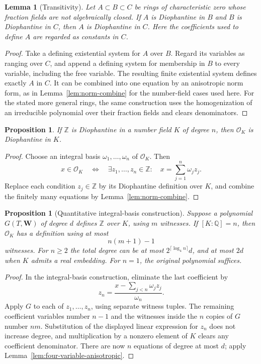 \documentclass[11pt]{article}
\newtheorem{proposition}[theorem]{Proposition}
\newtheorem{lemma}[theorem]{Lemma}
\theoremstyle{definition}
\begin{document}
\begin{lemma}[Transitivity]\label{lem:diophantine-transitivity-nf}
Let $A\subset B\subset C$ be rings of characteristic zero whose
fraction fields are not algebraically closed.  If $A$ is Diophantine in
$B$ and $B$ is Diophantine in $C$, then $A$ is Diophantine in $C$.
Here the coefficients used to define $A$ are regarded as constants in $C$.
\end{lemma}
\begin{proof}
Take a defining existential system for $A$ over $B$.  Regard its
variables as ranging over $C$, and append a defining system for
membership in $B$ to every variable, including the free variable.
The resulting finite existential system defines exactly $A$ in $C$.
It can be combined into one equation by an anisotropic norm form,
as in Lemma~\ref{lem:norm-combine} for the number-field cases used here.
For the stated more general rings, the same construction uses the
homogenization of an irreducible polynomial over their fraction fields
and clears denominators.
\end{proof}

\begin{proposition}\label{prop:integral-basis-transfer}
If $\mathbb Z$ is Diophantine in a number field $K$ of degree $n$, then
$\mathcal O_K$ is Diophantine in $K$.
\end{proposition}
\begin{proof}
Choose an integral basis $\omega_1,\ldots,\omega_n$ of $\mathcal O_K$.
Then
\[
 x\in\mathcal O_K\quad\Longleftrightarrow\quad
 \exists z_1,\ldots,z_n\in\mathbb Z:\quad
 x=\sum_{j=1}^n\omega_jz_j.
\]
Replace each condition $z_j\in\mathbb Z$ by its Diophantine
definition over $K$, and combine the finitely many equations by
Lemma~\ref{lem:norm-combine}.
\end{proof}

\begin{proposition}[Quantitative integral-basis construction]
\label{prop:quantitative-integral-basis}
Suppose a polynomial $G(T,\mathbf W)$ of degree $d$ defines
$\mathbb Z$ over $K$, using $m$ witnesses.  If $[K:\mathbb Q]=n$,
then $\mathcal O_K$ has a definition using at most
\[
 n(m+1)-1
\]
witnesses.  For $n\geq2$ the total degree can be at most
$2^{\lceil\log_4 n\rceil}d$, and at most $2d$ when $K$ admits a
real embedding.  For $n=1$, the original polynomial suffices.
\end{proposition}
\begin{proof}
In the integral-basis construction, eliminate the last coefficient by
\[
 z_n=\frac{x-\sum_{j<n}\omega_j z_j}{\omega_n}.
\]
Apply $G$ to each of $z_1,\ldots,z_n$, using separate witness tuples.
The remaining coefficient variables number $n-1$ and the witnesses
inside the $n$ copies of $G$ number $nm$.  Substitution of the displayed
linear expression for $z_n$ does not increase degree, and multiplication
by a nonzero element of $K$ clears any coefficient denominator.  There
are now $n$ equations of degree at most $d$; apply
Lemma~\ref{lem:four-variable-anisotropic}.
\end{proof}
\end{document}
